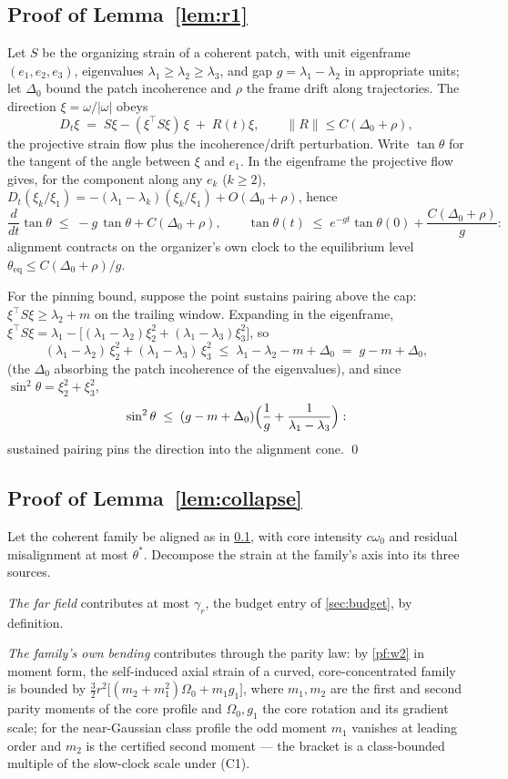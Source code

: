 \documentclass[11pt,letterpaper]{amsart}
\theoremstyle{definition}
\theoremstyle{remark}
\newcommand{\om}{\omega}
\newcommand{\norm}[1]{\lVert #1 \rVert}
\newcommand{\abs}[1]{\lvert #1 \rvert}
\begin{document}
\subsection{Proof of Lemma~\ref{lem:r1}}\label{pf:r1}
Let $S$ be the organizing strain of a coherent patch, with unit eigenframe
$(e_1,e_2,e_3)$, eigenvalues $\lambda_1\ge\lambda_2\ge\lambda_3$, and gap
$g=\lambda_1-\lambda_2$ in appropriate units; let $\Delta_0$ bound the patch
incoherence and $\rho$ the frame drift along trajectories. The direction
$\xi=\om/\abs{\om}$ obeys
\[
D_t\xi\;=\;S\xi-(\xi^{\top}S\xi)\,\xi\;+\;R(t)\xi,
\qquad \norm{R}\le C(\Delta_0+\rho),
\]
the projective strain flow plus the incoherence/drift perturbation. Write
$\tan\theta$ for the tangent of the angle between $\xi$ and $e_1$. In the eigenframe
the projective flow gives, for the component along any $e_k$ ($k\ge2$),
$D_t(\xi_k/\xi_1)=-(\lambda_1-\lambda_k)(\xi_k/\xi_1)+O(\Delta_0+\rho)$, hence
\[
\frac{d}{dt}\tan\theta\;\le\;-g\,\tan\theta+C(\Delta_0+\rho),
\qquad
\tan\theta(t)\;\le\;e^{-gt}\tan\theta(0)+\frac{C(\Delta_0+\rho)}{g}:
\]
alignment contracts on the organizer's own clock to the equilibrium level
$\theta_{\mathrm{eq}}\le C(\Delta_0+\rho)/g$.

For the pinning bound, suppose the point sustains pairing above the cap:
$\xi^{\top}S\xi\ge\lambda_2+m$ on the trailing window. Expanding in the eigenframe,
$\xi^{\top}S\xi=\lambda_1-\bigl[(\lambda_1-\lambda_2)\xi_2^2
+(\lambda_1-\lambda_3)\xi_3^2\bigr]$, so
\[
(\lambda_1-\lambda_2)\,\xi_2^2+(\lambda_1-\lambda_3)\,\xi_3^2
\;\le\;\lambda_1-\lambda_2-m+\Delta_0\;=\;g-m+\Delta_0 ,
\]
(the $\Delta_0$ absorbing the patch incoherence of the eigenvalues), and since
$\sin^2\theta=\xi_2^2+\xi_3^2$,
\[
\sin^2\theta\;\le\;(g-m+\Delta_0)\Bigl(\frac1g+\frac{1}{\lambda_1-\lambda_3}\Bigr):
\]
sustained pairing pins the direction into the alignment cone. \qed

\subsection{Proof of Lemma~\ref{lem:collapse}}\label{pf:collapse}
Let the coherent family be aligned as in \cref{pf:r1}, with core intensity $c\om_0$
and residual misalignment at most $\theta^*$. Decompose the strain at the family's
axis into its three sources.

\emph{The far field} contributes at most $\gamma_r$, the budget entry of
\cref{sec:budget}, by definition.

\emph{The family's own bending} contributes through the parity law: by
\cref{pf:w2} in moment form, the self-induced axial strain of a curved,
core-concentrated family is bounded by
$\tfrac32r^2\bigl[(m_2+m_1^2)\Omega_0+m_1g_1\bigr]$, where $m_1,m_2$ are the first
and second parity moments of the core profile and $\Omega_0,g_1$ the core rotation
and its gradient scale; for the near-Gaussian class profile the odd moment $m_1$
vanishes at leading order and $m_2$ is the certified second moment --- the bracket is
a class-bounded multiple of the slow-clock scale under (C1).
\end{document}
